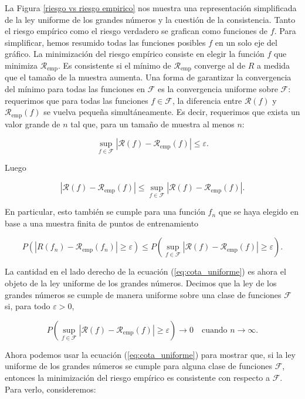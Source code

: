 \documentclass{report}
\begin{document}
La Figura \ref{riesgo vs riesgo empirico} nos muestra una representación simplificada de la ley uniforme de los grandes números y la cuestión
de la consistencia. Tanto el riesgo empírico como el riesgo verdadero se grafican como funciones de \(f\).
Para simplificar, hemos resumido todas las funciones posibles \(f\) en un solo eje del gráfico. La minimización
del riesgo empírico consiste en elegir la función \(f\) que minimiza \(\mathcal{R}_{\text{emp}}\). Es consistente si el
mínimo de \(\mathcal{R}_{\text{emp}}\) converge al de \(R\) a medida que el tamaño de la muestra aumenta. Una forma de
garantizar la convergencia del mínimo para todas las funciones en \(\mathcal{F}\) es la convergencia uniforme sobre
\(\mathcal{F}\): requerimos que para todas las funciones \(f \in \mathcal{F}\), la diferencia entre \(\mathcal{R}(f)\) y \(\mathcal{R}_{\text{emp}}(f)\)
se vuelva pequeña simultáneamente. Es decir, requerimos que exista un valor grande de \(n\) tal que, para un
tamaño de muestra al menos \(n\):

\[
\sup_{f \in \mathcal{F}} |\mathcal{R}(f) - \mathcal{R}_{\text{emp}}(f)| \leq \varepsilon.
\]

Luego

\[
|\mathcal{R}(f) - \mathcal{R}_{\text{emp}}(f)| \leq \sup_{f \in \mathcal{F}} |\mathcal{R}(f) - \mathcal{R}_{\text{emp}}(f)|.
\]

En particular, esto también se cumple para una función \(f_n\) que se haya elegido en base a una muestra finita
de puntos de entrenamiento

\begin{equation}
P(|R(f_n) - \mathcal{R}_{\text{emp}}(f_n)| \geq \varepsilon) \leq P\left(\sup_{f \in \mathcal{F}} |\mathcal{R}(f) - \mathcal{R}_{\text{emp}}(f)| \geq \varepsilon\right). \label{eq:cota_uniforme}
\end{equation}

La cantidad en el lado derecho de la ecuación (\ref{eq:cota_uniforme}) es ahora el objeto de la ley uniforme de los grandes números.
Decimos que la ley de los grandes números se cumple de manera uniforme sobre una clase de funciones \(\mathcal{F}\) si,
para todo \(\varepsilon > 0\),

\[
P\left(\sup_{f \in \mathcal{F}} |\mathcal{R}(f) - \mathcal{R}_{\text{emp}}(f)| \geq \varepsilon \right) \to 0 \quad \text{cuando } n \to \infty.
\]

Ahora podemos usar la ecuación (\ref{eq:cota_uniforme}) para mostrar que, si la ley uniforme de los grandes números se cumple para
alguna clase de funciones \(\mathcal{F}\), entonces la minimización del riesgo empírico es consistente con respecto a \(\mathcal{F}\).
Para verlo, consideremos:
\end{document}
